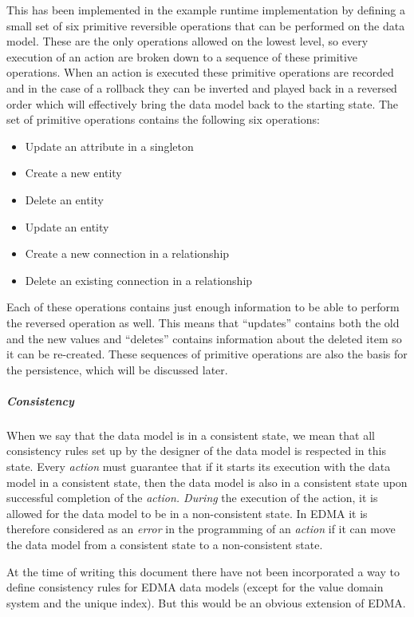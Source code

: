 This has been implemented in the example runtime implementation by
defining a small set of six primitive reversible operations that can
be performed on the data model. These are the only operations allowed
on the lowest level, so every execution of an action are broken down
to a sequence of these primitive operations. When an action is executed
these primitive operations are recorded and in the case of a rollback
they can be inverted and played back in a reversed order which will
effectively bring the data model back to the starting state. The set
of primitive operations contains the following six operations:
\begin{itemize}
\item Update an attribute in a singleton
\item Create a new entity
\item Delete an entity
\item Update an entity
\item Create a new connection in a relationship
\item Delete an existing connection in a relationship
\end{itemize}
Each of these operations contains just enough information to be able
to perform the reversed operation as well. This means that ``updates''
contains both the old and the new values and ``deletes'' contains
information about the deleted item so it can be re-created. These
sequences of primitive operations are also the basis for the persistence,
which will be discussed later.


\subparagraph{Consistency}

When we say that the data model is in a consistent state, we mean
that all consistency rules set up by the designer of the data model
is respected in this state. Every \emph{action} must guarantee that
if it starts its execution with the data model in a consistent state,
then the data model is also in a consistent state upon successful
completion of the \emph{action. During }the execution of the action,
it is allowed for the data model to be in a non-consistent state.
In EDMA it is therefore considered as an \emph{error} in the programming
of an \emph{action} if it can move the data model from a consistent
state to a non-consistent state.

At the time of writing this document there have not been incorporated
a way to define consistency rules for EDMA data models (except for
the value domain system and the unique index). But this would be an
obvious extension of EDMA.

